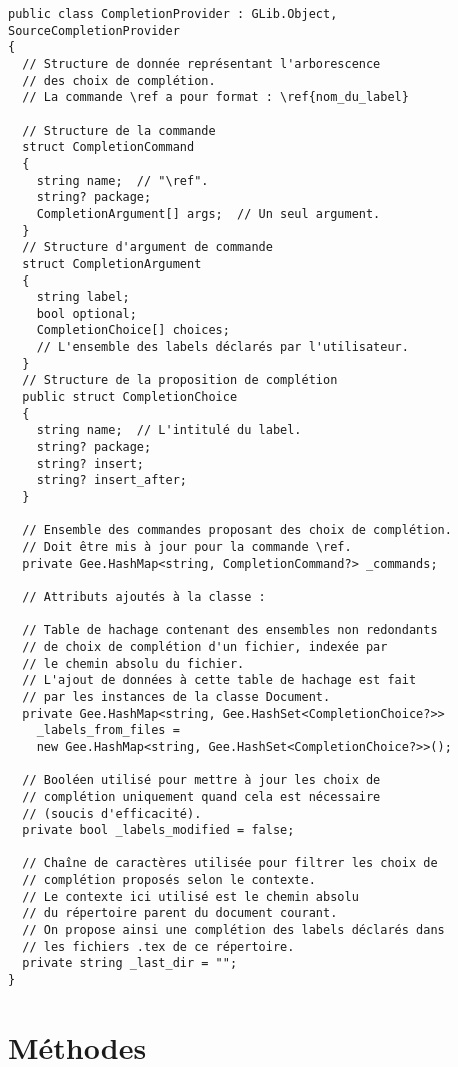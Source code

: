 \documentclass[a4paper,11pt]{report}
\begin{document}
\begin{lstlisting}[frame=single]
public class CompletionProvider : GLib.Object, SourceCompletionProvider
{
  // Structure de donnée représentant l'arborescence
  // des choix de complétion.
  // La commande \ref a pour format : \ref{nom_du_label}
  
  // Structure de la commande
  struct CompletionCommand
  {
    string name;  // "\ref".
    string? package;
    CompletionArgument[] args;  // Un seul argument.
  }
  // Structure d'argument de commande
  struct CompletionArgument
  {
    string label;
    bool optional;
    CompletionChoice[] choices;
    // L'ensemble des labels déclarés par l'utilisateur.
  }
  // Structure de la proposition de complétion
  public struct CompletionChoice
  {
    string name;  // L'intitulé du label.
    string? package;
    string? insert;
    string? insert_after;
  }
  
  // Ensemble des commandes proposant des choix de complétion.
  // Doit être mis à jour pour la commande \ref.
  private Gee.HashMap<string, CompletionCommand?> _commands;
  
  // Attributs ajoutés à la classe :
  
  // Table de hachage contenant des ensembles non redondants
  // de choix de complétion d'un fichier, indexée par
  // le chemin absolu du fichier.
  // L'ajout de données à cette table de hachage est fait
  // par les instances de la classe Document.
  private Gee.HashMap<string, Gee.HashSet<CompletionChoice?>> 
    _labels_from_files =
    new Gee.HashMap<string, Gee.HashSet<CompletionChoice?>>();
  
  // Booléen utilisé pour mettre à jour les choix de
  // complétion uniquement quand cela est nécessaire
  // (soucis d'efficacité).
  private bool _labels_modified = false;
  
  // Chaîne de caractères utilisée pour filtrer les choix de
  // complétion proposés selon le contexte.
  // Le contexte ici utilisé est le chemin absolu
  // du répertoire parent du document courant.
  // On propose ainsi une complétion des labels déclarés dans
  // les fichiers .tex de ce répertoire.
  private string _last_dir = "";
}
\end{lstlisting}

\section{Méthodes}
\label{sec:CP_méthodes}
\end{document}
